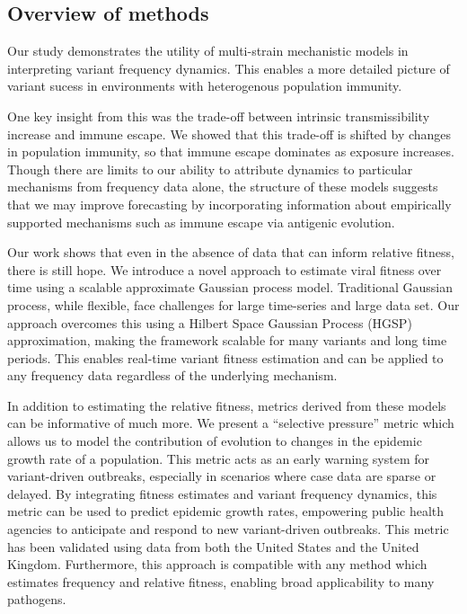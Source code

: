 \documentclass[11pt,oneside,letterpaper]{article}
\begin{document}

\subsection*{Overview of methods}

Our study demonstrates the utility of multi-strain mechanistic models in interpreting variant frequency dynamics.
This enables a more detailed picture of variant sucess in environments with heterogenous population immunity.

One key insight from this was the trade-off between intrinsic transmissibility increase and immune escape.
We showed that this trade-off is shifted by changes in population immunity, so that immune escape dominates as exposure increases.
Though there are limits to our ability to attribute dynamics to particular mechanisms from frequency data alone, the structure of these models suggests that we may improve forecasting by incorporating information about empirically supported mechanisms such as immune escape via antigenic evolution.

Our work shows that even in the absence of data that can inform relative fitness, there is still hope.
We introduce a novel approach to estimate viral fitness over time using a scalable approximate Gaussian process model.
Traditional Gaussian process, while flexible, face challenges for large time-series and large data set.
Our approach overcomes this using a Hilbert Space Gaussian Process (HGSP) approximation, making the framework scalable for many variants and long time periods.
This enables real-time variant fitness estimation and can be applied to any frequency data regardless of the underlying mechanism.

In addition to estimating the relative fitness, metrics derived from these models can be informative of much more.
We present a ``selective pressure'' metric which allows us to model the contribution of evolution to changes in the epidemic growth rate of a population.
This metric acts as an early warning system for variant-driven outbreaks, especially in scenarios where case data are sparse or delayed.
By integrating fitness estimates and variant frequency dynamics, this metric can be used to predict epidemic growth rates, empowering public health agencies to anticipate and respond to new variant-driven outbreaks.
This metric has been validated using data from both the United States and the United Kingdom.
Furthermore, this approach is compatible with any method which estimates frequency and relative fitness, enabling broad applicability to many pathogens.
\end{document}
